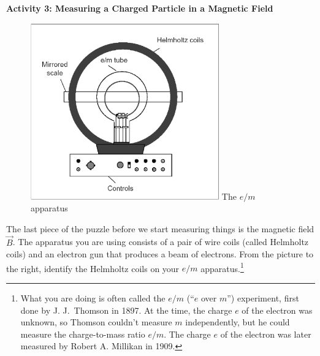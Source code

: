 \begin{enumerate}[labparts]

\end{enumerate}

\pagebreak[3]

\vspace*{0.2in}

\textbf{Activity 3: Measuring a Charged Particle in a Magnetic Field}


\begin{figure}
\begin{center}
\vspace{-0.5in}
\includegraphics[trim=2mm 2mm 2mm 2mm, clip, height=3.0in]{eoverm/apparatus1.eps}
The $e/m$ apparatus
\end{center}
\end{figure}

\bigskip\bigskip

The last piece of the puzzle before we start measuring things is the magnetic 
field $\vec B$. The apparatus you are using consists of a pair of wire coils 
(called Helmholtz coils) and an electron gun that produces a beam of electrons.
From the picture to the right, identify the Helmholtz coils on your $e/m$ apparatus.\footnote{What you are doing is often called the $e/m$ (``$e$ over $m$'') experiment, first done by J. J.~Thomson in 1897.  At the time, the charge $e$ of the electron was unknown, so Thomson couldn't measure $m$ independently, but he could measure the charge-to-mass ratio $e/m$.   The charge $e$ of the electron was later measured by Robert A. Millikan in 1909.}


